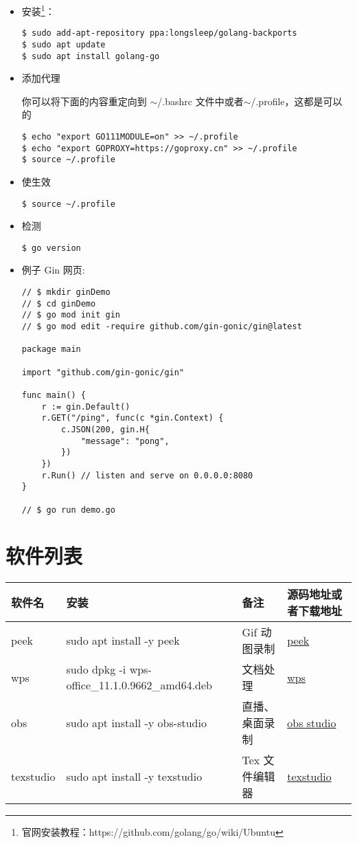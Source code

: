 \begin{itemize}
\item 安装\footnote{官网安装教程：https://github.com/golang/go/wiki/Ubuntu}：
\begin{lstlisting}
$ sudo add-apt-repository ppa:longsleep/golang-backports
$ sudo apt update
$ sudo apt install golang-go
\end{lstlisting}
	
\item 添加代理

你可以将下面的内容重定向到 $\sim$/.bashrc 文件中或者$\sim$/.profile，这都是可以的
\begin{lstlisting}
$ echo "export GO111MODULE=on" >> ~/.profile
$ echo "export GOPROXY=https://goproxy.cn" >> ~/.profile
$ source ~/.profile
\end{lstlisting}

\item 使生效
\begin{lstlisting}
$ source ~/.profile
\end{lstlisting}
	
\item 检测
\begin{lstlisting}
$ go version
\end{lstlisting}

\item 例子 Gin 网页: 

\begin{lstlisting}
// $ mkdir ginDemo
// $ cd ginDemo 
// $ go mod init gin	
// $ go mod edit -require github.com/gin-gonic/gin@latest	
	
package main

import "github.com/gin-gonic/gin"

func main() {
	r := gin.Default()
	r.GET("/ping", func(c *gin.Context) {
		c.JSON(200, gin.H{
			"message": "pong",
		})
	})
	r.Run() // listen and serve on 0.0.0.0:8080
}

// $ go run demo.go 
\end{lstlisting}
\end{itemize}

\section{软件列表}
\begin{tabular}{|l|l|l|p{3cm}|}
	\hline
	软件名 & 安装 & 备注 & 源码地址或者下载地址\\
	\hline
	peek &  sudo apt install -y peek & Gif 动图录制 & \href{https://github.com/phw/peek}{peek}\\      
	\hline
	wps & sudo dpkg -i wps-office\_11.1.0.9662\_amd64.deb & 文档处理 & \href{https://linux.wps.cn/}{wps}\\      
	\hline
	obs & sudo apt install -y obs-studio & 直播、桌面录制&\href{https://obsproject.com/}{obs studio}\\
	\hline
	texstudio & sudo apt install -y texstudio & Tex 文件编辑器 &\href{https://www.texstudio.org}{texstudio}\\
	\hline
\end{tabular}